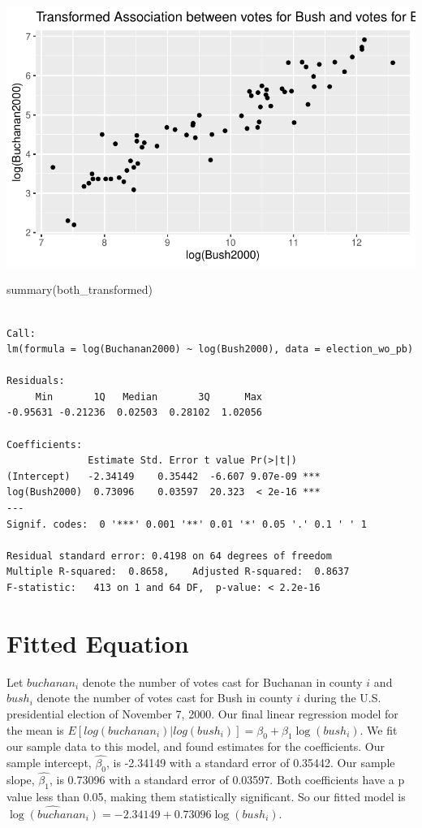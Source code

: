 \documentclass[
  letterpaper,
  DIV=11,
  numbers=noendperiod]{scrartcl}
\newenvironment{Shaded}{\begin{snugshade}}{\end{snugshade}}
\newcommand{\FunctionTok}[1]{\textcolor[rgb]{0.28,0.35,0.67}{#1}}
\newcommand{\NormalTok}[1]{\textcolor[rgb]{0.00,0.23,0.31}{#1}}
\begin{document}
\includegraphics{case_study_1_files/figure-pdf/unnamed-chunk-6-2.pdf}

\begin{Shaded}
\begin{Highlighting}[]
\FunctionTok{summary}\NormalTok{(both\_transformed)}
\end{Highlighting}
\end{Shaded}

\begin{verbatim}

Call:
lm(formula = log(Buchanan2000) ~ log(Bush2000), data = election_wo_pb)

Residuals:
     Min       1Q   Median       3Q      Max 
-0.95631 -0.21236  0.02503  0.28102  1.02056 

Coefficients:
              Estimate Std. Error t value Pr(>|t|)    
(Intercept)   -2.34149    0.35442  -6.607 9.07e-09 ***
log(Bush2000)  0.73096    0.03597  20.323  < 2e-16 ***
---
Signif. codes:  0 '***' 0.001 '**' 0.01 '*' 0.05 '.' 0.1 ' ' 1

Residual standard error: 0.4198 on 64 degrees of freedom
Multiple R-squared:  0.8658,    Adjusted R-squared:  0.8637 
F-statistic:   413 on 1 and 64 DF,  p-value: < 2.2e-16
\end{verbatim}

\hypertarget{fitted-equation}{%
\section{Fitted Equation}\label{fitted-equation}}

Let \(buchanan_i\) denote the number of votes cast for Buchanan in
county \(i\) and \(bush_i\) denote the number of votes cast for Bush in
county \(i\) during the U.S. presidential election of November 7, 2000.
Our final linear regression model for the mean is
\(E[log(buchanan_i) | log(bush_i)] = \beta_0 + \beta_1\log(bush_i).\) We
fit our sample data to this model, and found estimates for the
coefficients. Our sample intercept, \(\hat{\beta_0}\), is -2.34149 with
a standard error of 0.35442. Our sample slope, \(\hat{\beta_1}\), is
0.73096 with a standard error of 0.03597. Both coefficients have a p
value less than 0.05, making them statistically significant. So our
fitted model is
\(\widehat{\log(buchanan_i)} = -2.34149 + 0.73096\log(bush_i).\)
\end{document}

